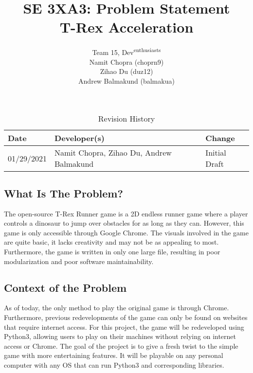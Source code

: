\documentclass{article}
\title{SE 3XA3: Problem Statement\\T-Rex Acceleration}
\author{Team 15, Dev\textsuperscript{enthusiasts}
		\\ Namit Chopra (choprn9) 
		\\ Zihao Du (duz12)
		\\ Andrew Balmakund (balmakua)
}
\date{}
\begin{document}
\begin{table}[hp]
\caption{Revision History} \label{TblRevisionHistory}
\begin{tabularx}{\textwidth}{llX}
\toprule
\textbf{Date} & \textbf{Developer(s)} & \textbf{Change}\\
\midrule
01/29/2021 & Namit Chopra, Zihao Du, Andrew Balmakund & Initial Draft\\
\bottomrule
\end{tabularx}
\end{table}

\newpage

\maketitle

\subsection*{What Is The Problem?}
\qquad The open-source T-Rex Runner game is a 2D endless runner game where a player controls a dinosaur to jump over obstacles for as long as they can. However, this game is only accessible through Google Chrome. The visuals involved in the game are quite basic, it lacks creativity and may not be as appealing to most. Furthermore, the game is written in only one large file, resulting in poor modularization and poor software maintainability.

\subsection*{Context of the Problem}
\qquad As of today, the only method to play the original game is through Chrome. Furthermore, previous redevelopments of the game can only be found on websites that require internet access. For this project, the game will be redeveloped using Python3, allowing users to play on their machines without relying on internet access or Chrome. The goal of the project is to give a fresh twist to the simple game with more entertaining features. It will be playable on any personal computer with any OS that can run Python3 and corresponding libraries.
\end{document}
